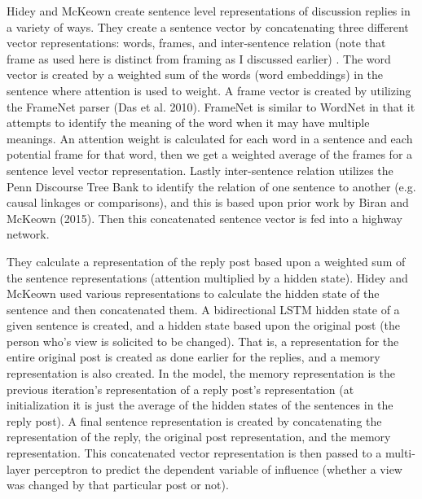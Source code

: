 \documentclass[11pt,a4paper]{article}
\begin{document}
Hidey and McKeown create sentence level representations of discussion replies in a variety of ways. They create a sentence vector by concatenating three different vector representations: words, frames, and inter-sentence relation  (note that frame as used here is distinct from framing as I discussed earlier) . The word vector is created by a weighted sum of the words (word embeddings) in the sentence where attention is used to weight. A frame vector is created by utilizing the FrameNet parser (Das et al. 2010). FrameNet is similar to WordNet in that it attempts to identify the meaning of the word when it may have multiple meanings. An attention weight is calculated for each word in a sentence and each potential frame for that word, then we get a weighted average of the frames for a sentence level vector representation. Lastly inter-sentence relation utilizes the Penn Discourse Tree Bank to identify the relation of one sentence to another (e.g. causal linkages or comparisons), and this is based upon prior work by Biran and McKeown (2015). Then this concatenated sentence vector is fed into a highway network. %

They calculate a representation of the reply post based upon a weighted sum of the sentence representations (attention multiplied by a hidden state).  Hidey and McKeown used various representations to calculate the hidden state of the sentence and then concatenated them. A bidirectional LSTM hidden state of a given sentence is created, and a hidden state based upon  the original post (the person who's view is solicited to be changed). That is, a representation for the entire original post is created as done earlier for the replies, and a memory representation is also created. In the model, the memory representation is the previous iteration's representation of a reply post's representation (at initialization it is just the average of the hidden states of the sentences in the reply post). A final sentence representation is created by concatenating  the representation of the reply, the original post representation, and the memory representation. This concatenated vector representation is then  passed to a multi-layer perceptron to predict the dependent variable of influence (whether a view was changed by that particular post or not).
\end{document}
